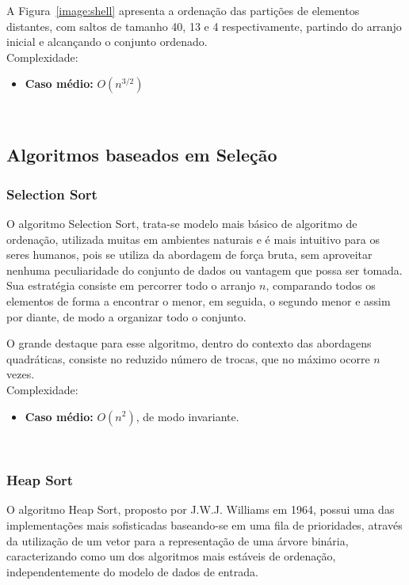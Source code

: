 \documentclass[conference]{IEEEtran}
\begin{document}
A Figura~\ref{image:shell} apresenta a ordenação das partições de elementos distantes, com saltos de tamanho 40, 13 e 4 respectivamente, partindo do arranjo inicial e alcançando o conjunto ordenado.\\

Complexidade:
\begin{itemize}
\item \textbf{Caso médio:} $O (n^{3/2})$
\end{itemize}
~\\
\subsection{Algoritmos baseados em Seleção}


\subsubsection{Selection Sort}

O algoritmo Selection Sort, trata-se modelo mais básico de algoritmo de ordenação, utilizada muitas em ambientes naturais e é mais intuitivo para os seres humanos, pois se utiliza da abordagem de força bruta, sem aproveitar nenhuma peculiaridade do conjunto de dados ou vantagem que possa ser tomada. Sua estratégia consiste em percorrer todo o arranjo $n$, comparando todos os elementos de forma a encontrar o menor, em seguida, o segundo menor e assim por diante, de modo a organizar todo o conjunto.

O grande destaque para esse algoritmo, dentro do contexto das abordagens quadráticas, consiste no reduzido número de trocas, que no máximo ocorre $n$ vezes.\\

Complexidade:
\begin{itemize}
\item \textbf{Caso médio:} $O (n^2)$, de modo invariante.
\end{itemize}

~\\
\subsubsection{Heap Sort}

O algoritmo Heap Sort, proposto por J.W.J. Williams em 1964, possui uma das implementações mais sofisticadas baseando-se em uma fila de prioridades, através da utilização de um vetor para a representação de uma árvore binária, caracterizando como um dos algoritmos mais estáveis de ordenação, independentemente do modelo de dados de entrada. 
\end{document}
